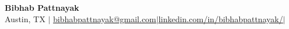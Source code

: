 \documentclass[letterpaper,10.5pt]{article}
\newcommand{\resumeItem}[1]{
  \item\small{
    {#1 \vspace{1pt}}
  }
}
\newcommand{\resumeItemListStart}{\begin{itemize}}
\newcommand{\resumeItemListEnd}{\end{itemize}\vspace{-5pt}}
\begin{document}
\begin{center}
	\small \textbf{\Large Bibhab Pattnayak} \\  
	Austin, TX \hspace{4pt}$\vert$ \hspace{4pt} \href{mailto:bibhabpattnayak@gmail.com}{\color{blue}\underline{bibhabpattnayak@gmail.com}}\hspace{4pt}$\vert$\hspace{4pt}\href{https://www.linkedin.com/in/bibhabpattnayak/}{\color{blue}\underline{linkedin.com/in/bibhabpattnayak/}\hspace{4pt}}$\vert$\hspace{4pt} \hspace{4pt}{480 - 955 - 9942} 
	\\ 
\end{center}
\vspace{-20pt}
\vspace{2pt}

\vspace{-5pt}



%
\end{document}
